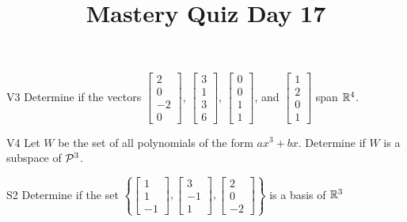 \documentclass{sbgLAquiz}
\title{Mastery Quiz Day 17 }
\begin{document}
\begin{problem}{V3}
Determine if the vectors $\begin{bmatrix} 2 \\ 0 \\ -2 \\ 0 \end{bmatrix}$, $\begin{bmatrix} 3 \\ 1 \\ 3 \\ 6 \end{bmatrix}$, $\begin{bmatrix} 0 \\ 0 \\ 1 \\ 1 \end{bmatrix}$, and $\begin{bmatrix}1 \\ 2 \\ 0 \\ 1 \end{bmatrix}$ span $\IR^4$.
\end{problem}

\begin{problem}{V4} Let $W$ be the set of all polynomials of the form
\(ax^3+bx\).  Determine if $W$ is a subspace of \(\P^3\).
\end{problem}
\newpage

\begin{problem}{S2}
Determine if the set $\left\{\begin{bmatrix} 1 \\ 1 \\ -1 \end{bmatrix}, \begin{bmatrix} 3 \\ -1 \\ 1 \end{bmatrix},\begin{bmatrix} 2 \\ 0 \\ -2 \end{bmatrix}\right\}$ is a basis of $\IR^3$
\end{problem}
\end{document}
